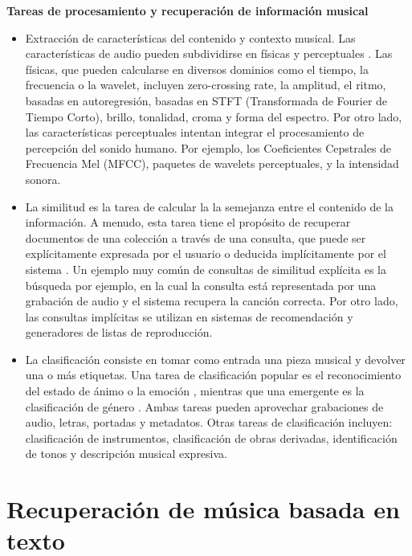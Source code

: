 \textbf{Tareas de procesamiento y recuperación de información musical}
\begin{itemize}
    \item Extracción de características del contenido y contexto musical. Las características de audio pueden subdividirse en físicas y perceptuales \cite{Alas2016ARO}. Las físicas, que pueden calcularse en diversos dominios como el tiempo, la frecuencia o la wavelet, incluyen zero-crossing rate, la amplitud, el ritmo, basadas en autoregresión, basadas en STFT (Transformada de Fourier de Tiempo Corto), brillo, tonalidad, croma y forma del espectro. Por otro lado, las características perceptuales intentan integrar el procesamiento de percepción del sonido humano. Por ejemplo, los Coeficientes Cepstrales de Frecuencia Mel (MFCC), paquetes de wavelets perceptuales, y la intensidad sonora.
    \item La similitud es la tarea de calcular la la semejanza entre el contenido de la información. A menudo, esta tarea tiene el propósito de recuperar documentos de una colección a través de una consulta, que puede ser explícitamente expresada por el usuario o deducida implícitamente por el sistema \cite{Simonetta2019MultimodalMI}. Un ejemplo muy común de consultas de similitud explícita es la búsqueda por ejemplo, en la cual la consulta está representada por una grabación de audio y el sistema recupera la canción correcta. Por otro lado, las consultas implícitas se utilizan en sistemas de recomendación y generadores de listas de reproducción.
    \item La clasificación consiste en tomar como entrada una pieza musical y devolver una o más etiquetas. Una tarea de clasificación popular es el reconocimiento del estado de ánimo o la emoción \cite{Kim2010StateOT}, mientras que una emergente es la clasificación de género \cite{Allamy20211DCA, AthulyaK2021DeepLB, Qiu2021DBTMPEDB, Rafi2021ComparativeAO, Koparde2021ASO, Ndou2021MusicGC, Prince2022MusicGC}. Ambas tareas pueden aprovechar grabaciones de audio, letras, portadas y metadatos. Otras tareas de clasificación incluyen: clasificación de instrumentos, clasificación de obras derivadas, identificación de tonos y descripción musical expresiva.
\end{itemize}

\section{Recuperación de música basada en texto}
\label{sec:text-based retrieval}

